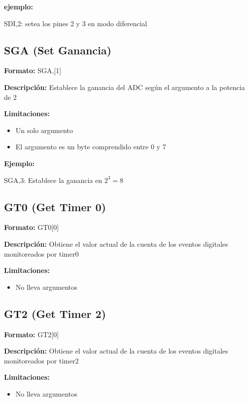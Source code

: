 \documentclass{article}
\theoremstyle{definition}
\theoremstyle{remark}
\begin{document}
\textbf{ejemplo:}

SDI,2: setea los pines 2 y 3 en modo diferencial

\subsection{SGA (Set Ganancia)} %
\label{sub:sga_set_ganancia}


\textbf{Formato:} SGA,[1]

\textbf{Descripción:}
Establece la ganancia del ADC según el argumento a la potencia de 2

\textbf{Limitaciones:}
\begin{itemize}
  \item Un solo argumento
  \item El argumento es un byte comprendido entre 0 y 7
\end{itemize}

\textbf{Ejemplo:}

SGA,3: Establece la ganancia en $2^{3} = 8$


\subsection{GT0 (Get Timer 0)} %
\label{sub:gt0_get_timer_0}


\textbf{Formato:} GT0[0]

\textbf{Descripción:}
Obtiene el valor actual de la cuenta de los eventos digitales monitoreados por timer0

\textbf{Limitaciones:}
\begin{itemize}
  \item No lleva argumentos
\end{itemize}

\subsection{GT2 (Get Timer 2)} %
\label{sub:gt2_get_timer_2}

\textbf{Formato:} GT2[0]

\textbf{Descripción:}
Obtiene el valor actual de la cuenta de los eventos digitales monitoreados por timer2

\textbf{Limitaciones:}
\begin{itemize}
  \item No lleva argumentos
\end{itemize}
\end{document}
